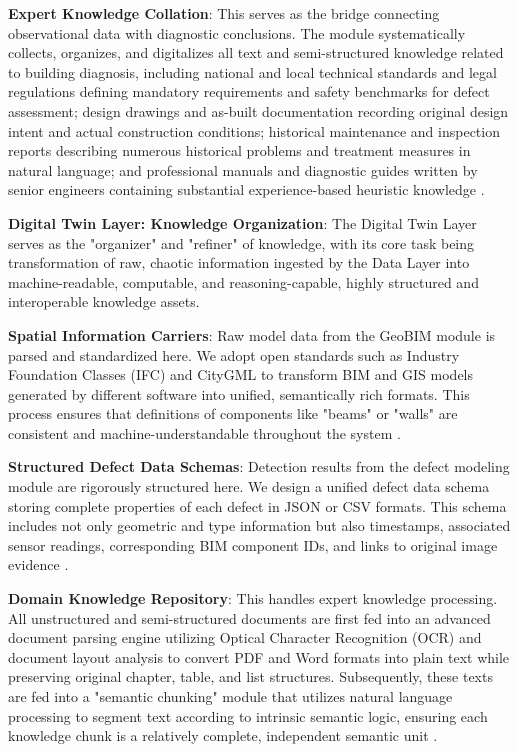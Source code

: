 \textbf{Expert Knowledge Collation}: This serves as the bridge connecting observational data with diagnostic conclusions. The module systematically collects, organizes, and digitalizes all text and semi-structured knowledge related to building diagnosis, including national and local technical standards and legal regulations defining mandatory requirements and safety benchmarks for defect assessment; design drawings and as-built documentation recording original design intent and actual construction conditions; historical maintenance and inspection reports describing numerous historical problems and treatment measures in natural language; and professional manuals and diagnostic guides written by senior engineers containing substantial experience-based heuristic knowledge \cite{hamdan2021semantic}.

\textbf{Digital Twin Layer: Knowledge Organization}: The Digital Twin Layer serves as the "organizer" and "refiner" of knowledge, with its core task being transformation of raw, chaotic information ingested by the Data Layer into machine-readable, computable, and reasoning-capable, highly structured and interoperable knowledge assets.

\textbf{Spatial Information Carriers}: Raw model data from the GeoBIM module is parsed and standardized here. We adopt open standards such as Industry Foundation Classes (IFC) and CityGML to transform BIM and GIS models generated by different software into unified, semantically rich formats. This process ensures that definitions of components like "beams" or "walls" are consistent and machine-understandable throughout the system \cite{tang2019retrieving}.

\textbf{Structured Defect Data Schemas}: Detection results from the defect modeling module are rigorously structured here. We design a unified defect data schema storing complete properties of each defect in JSON or CSV formats. This schema includes not only geometric and type information but also timestamps, associated sensor readings, corresponding BIM component IDs, and links to original image evidence \cite{li2024single}.

\textbf{Domain Knowledge Repository}: This handles expert knowledge processing. All unstructured and semi-structured documents are first fed into an advanced document parsing engine utilizing Optical Character Recognition (OCR) and document layout analysis to convert PDF and Word formats into plain text while preserving original chapter, table, and list structures. Subsequently, these texts are fed into a "semantic chunking" module that utilizes natural language processing to segment text according to intrinsic semantic logic, ensuring each knowledge chunk is a relatively complete, independent semantic unit \cite{fan2023retrieval}.

